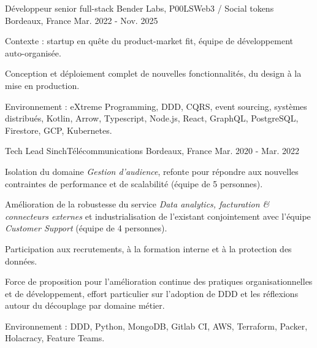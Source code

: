 

\begin{cventries}

  \cventry
    {Développeur senior full-stack}
    {Bender Labs, P00LS{\enskip\cdotp\enskip}Web3 / Social tokens}
    {Bordeaux, France}
    {Mar. 2022 - Nov. 2025}
    {
      \begin{cvitems}
        \item {Contexte : startup en quête du product-market fit, équipe de développement auto-organisée.}
        \item {Conception et déploiement complet de nouvelles fonctionnalités, du design à la mise en production.}
        \item {Environnement : eXtreme Programming, DDD, CQRS, event sourcing, systèmes distribués, Kotlin, Arrow, Typescript, Node.js, React, GraphQL, PostgreSQL, Firestore, GCP, Kubernetes.}
      \end{cvitems}
    }

  \cventry
    {Tech Lead}
    {Sinch{\enskip\cdotp\enskip}Télécommunications}
    {Bordeaux, France}
    {Mar. 2020 - Mar. 2022}
    {
      \begin{cvitems}
        \item {Isolation du domaine \emph{Gestion d'audience}, refonte pour répondre aux nouvelles contraintes de performance et de scalabilité (équipe de 5 personnes).}
        \item {Amélioration de la robustesse du service \emph{Data analytics, facturation \& connecteurs externes} et industrialisation de l'existant conjointement avec l'équipe \emph{Customer Support} (équipe de 4 personnes).}
        \item {Participation aux recrutements, à la formation interne et à la protection des données.}
        \item {Force de proposition pour l'amélioration continue des pratiques organisationnelles et de développement, effort particulier sur l'adoption de DDD et les réflexions autour du découplage par domaine métier.}
        \item {Environnement : DDD, Python, MongoDB, Gitlab CI, AWS, Terraform, Packer, Holacracy, Feature Teams.}
      \end{cvitems}
    }


\end{cventries}
